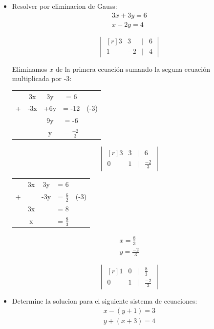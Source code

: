 \documentclass[a4paper, apacite, 12pt, doc]{apa6}
\begin{document}
\begin{itemize}
	\item Resolver por eliminacion de Gauss:
\begin{gather*}
	3x + 3y = 6 \\
	x- 2y = 4
\end{gather*}

\[
	\begin{vmatrix*}[r]
		3 & 3 & | & 6 \\
		1 & -2 & | & 4
	\end{vmatrix*}
\]

Eliminamos $x$ de la primera ecuación sumando la seguna ecuación multiplicada por -3:

\begin{center}
\begin{tabular}{ccccc}
	& 3x & 3y  &  = 6 &   \\
	+& -3x & +6y & = -12 & (-3)\\
	\hline
	&& 9y & = -6& \\
	&& y & = $\frac{-2}{3}$&
\end{tabular}
\end{center}


\[
	\begin{vmatrix*}[r]
		3 & 3 & | & 6 \\
		0 & 1& | & \frac{-2}{3}
	\end{vmatrix*}
\]


\begin{center}
\begin{tabular}{ccccc}
	& 3x & 3y  &  = 6 &   \\
	+&  & -3y & = $\frac{6}{2}$ & (-3)\\
	\hline
	&3x & & = 8& \\
	&x& & = $\frac{8}{3}$&
\end{tabular}
\end{center}


\begin{gather*}
	x = \frac{8}{3} \\
	y = \frac{-2}{3}
\end{gather*}


\[
	\begin{vmatrix*}[r]
		1 & 0 & | & \frac{8}{3} \\
		0 & 1& | & \frac{-2}{3}
	\end{vmatrix*}
\]


\item Determine la solucion para el siguiente sistema de ecuaciones:
	\begin{gather*}
		x - (y+1) = 3 \\
		y + (x+3) = 4
	\end{gather*}


\end{itemize}
\end{document}
